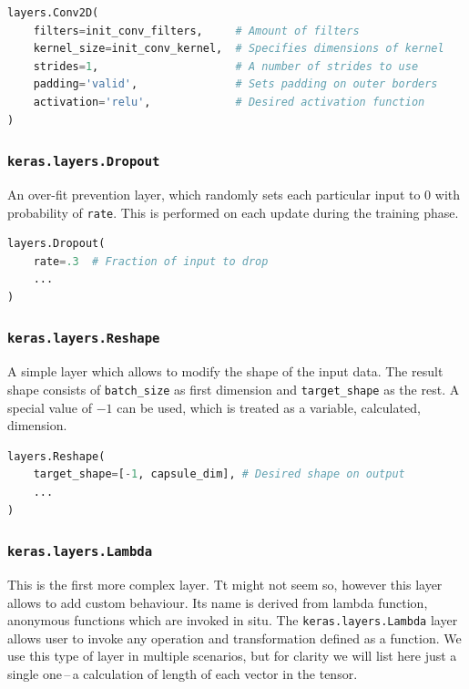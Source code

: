 \begin{lstlisting}[language=Python, caption=2D convolution layer]
layers.Conv2D(
    filters=init_conv_filters,     # Amount of filters
    kernel_size=init_conv_kernel,  # Specifies dimensions of kernel
    strides=1,                     # A number of strides to use
    padding='valid',               # Sets padding on outer borders
    activation='relu',             # Desired activation function
)
\end{lstlisting}

\subsubsection{\texttt{keras.layers.Dropout}}

An over-fit prevention layer, which randomly sets each particular input to 0 with probability of \texttt{rate}. This is performed on each update during the training phase.


\begin{lstlisting}[language=Python, caption=Dropout layer]
layers.Dropout(
    rate=.3  # Fraction of input to drop
    ...
)
\end{lstlisting}

\subsubsection{\texttt{keras.layers.Reshape}}

A simple layer which allows to modify the shape of the input data. The result shape consists of \texttt{batch\_size} as first dimension and \texttt{target\_shape} as the rest. A special value of $-1$ can be used, which is treated as a variable, calculated, dimension.

\begin{lstlisting}[language=Python, caption=Reshape layer]
layers.Reshape(
    target_shape=[-1, capsule_dim], # Desired shape on output
    ...
)
\end{lstlisting}

\subsubsection{\texttt{keras.layers.Lambda}}

This is the first more complex layer. Tt might not seem so, however this layer allows to add custom behaviour. Its name is derived from lambda function, anonymous functions which are invoked in situ. The \texttt{keras.layers.Lambda} layer allows user to invoke any operation and transformation defined as a function. We use this type of layer in multiple scenarios, but for clarity we will list here just a single one\,--\,a calculation of length of each vector in the tensor.

